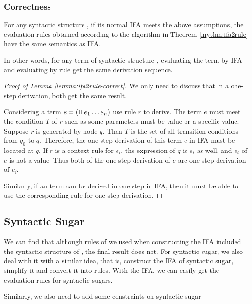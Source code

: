 \subsubsection{Correctness}

\begin{lemma}
\label{lemma:ifa2rule-correct}
For any syntactic structure , if its normal IFA meets the above assumptions, the evaluation rules obtained according to the algorithm in Theorem \ref{mythm:ifa2rule} have the same semantics as IFA. 
\end{lemma}

In other words, for any term of syntactic structure , evaluating the term by IFA and evaluating by rule get the same derivation sequence.

\begin{proof}[Proof of Lemma \ref{lemma:ifa2rule-correct}]
We only need to discuss that in a one-step derivation, both get the same result.

Considering a term $e=(\mbox{\tt H}~e_1 \ldots e_n)$ use rule $r$ to derive. The term $e$ must meet the condition $T$ of $r$ such as some parameters must be value or a specific value. Suppose $r$ is generated by node $q$. Then $T$ is the set of all transition conditions from $q_0$ to $q$. Therefore, the one-step derivation of this term $e$ in IFA must be located at $q$. If $r$ is a context rule for $e_i$, the expression of $q$ is $e_i$ as well, and $e_i$ of $e$ is not a value. Thus both of the one-step derivation of $e$ are one-step derivation of $e_i$.

Similarly, if an term can be derived in one step in IFA, then it must be able to use the corresponding rule for one-step derivation.

\end{proof}

\subsection{Syntactic Sugar}

We can find that although rules of  we used when constructing the IFA included the syntactic structure of , the final result does not. For syntactic sugar, we also deal with it with a similar idea, that is, construct the IFA of syntactic sugar, simplify it and convert it into rules. With the IFA, we can easily get the evaluation rules for syntactic sugars.

Similarly, we also need to add some constraints on syntactic sugar.

